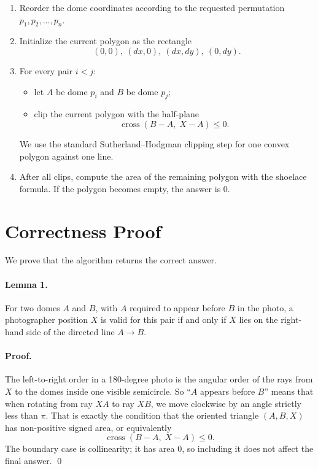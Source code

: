 \documentclass[11pt]{article}
\begin{document}
\begin{enumerate}[leftmargin=*]
    \item Reorder the dome coordinates according to the requested permutation
    $p_1, p_2, \dots, p_n$.
    \item Initialize the current polygon as the rectangle
    \[
        (0,0),\ (dx,0),\ (dx,dy),\ (0,dy).
    \]
    \item For every pair $i < j$:
    \begin{itemize}[leftmargin=*]
        \item let $A$ be dome $p_i$ and $B$ be dome $p_j$;
        \item clip the current polygon with the half-plane
        \[
            \operatorname{cross}(B-A,\; X-A) \le 0.
        \]
    \end{itemize}
    We use the standard Sutherland--Hodgman clipping step for one convex polygon against one line.
    \item After all clips, compute the area of the remaining polygon with the shoelace formula.
    If the polygon becomes empty, the answer is $0$.
\end{enumerate}

\section*{Correctness Proof}

We prove that the algorithm returns the correct answer.

\paragraph{Lemma 1.}
For two domes $A$ and $B$, with $A$ required to appear before $B$ in the photo, a photographer position $X$ is valid
for this pair if and only if $X$ lies on the right-hand side of the directed line $A \to B$.

\paragraph{Proof.}
The left-to-right order in a 180-degree photo is the angular order of the rays from $X$ to the domes inside one
visible semicircle.
So ``$A$ appears before $B$'' means that when rotating from ray $XA$ to ray $XB$, we move clockwise by an angle strictly
less than $\pi$.
That is exactly the condition that the oriented triangle $(A,B,X)$ has non-positive signed area, or equivalently
\[
    \operatorname{cross}(B-A,\; X-A) \le 0.
\]
The boundary case is collinearity; it has area $0$, so including it does not affect the final answer. \qed
\end{document}

